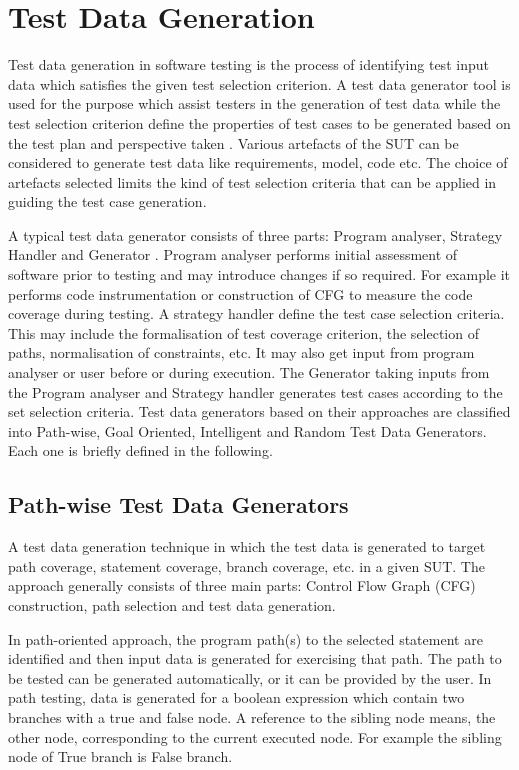 \section{Test Data Generation}
Test data generation in software testing is the process of identifying test input data which satisfies the given test selection criterion. A test data generator tool is used for the purpose which assist testers in the generation of test data while the test selection criterion define the properties of test cases to be generated based on the test plan and perspective taken \cite{korel1990}. Various artefacts of the SUT can be considered to generate test data like requirements, model, code etc. The choice of artefacts selected limits the kind of test selection criteria that can be applied in guiding the test case generation. 

A typical test data generator consists of three parts: Program analyser, Strategy Handler and Generator \cite{edvardsson1999survey}. Program analyser performs initial assessment of software prior to testing and may introduce changes if so required. For example it performs code instrumentation or construction of CFG to measure the code coverage during testing. A strategy handler define the test case selection criteria. This may include the formalisation of test coverage criterion, the selection of paths, normalisation of constraints, etc. It may also get input from   program analyser or user before or during execution. The Generator taking inputs from the Program analyser and Strategy handler generates test cases according to the set selection criteria.  Test data generators based on their approaches are classified into Path-wise, Goal Oriented, Intelligent and Random Test Data Generators. Each one is briefly defined in the following.

\subsection{Path-wise Test Data Generators}
A test data generation technique in which the test data is generated to target path coverage, statement coverage, branch coverage, etc. in a given SUT. The approach generally consists of three main parts: Control Flow Graph (CFG) construction, path selection and test data generation. 

In path-oriented approach, the program path(s) to the selected statement are identified and then input data is generated for exercising that path. The path to be tested can be generated automatically, or it can be provided by the user. In path testing, data is generated for a boolean expression which contain two branches with a true and false node. A reference to the sibling node means, the other node, corresponding to the current executed node. For example the sibling node of True branch is False branch.

